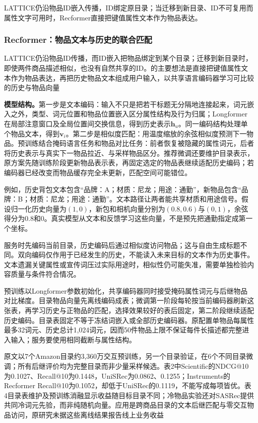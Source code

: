 LATTICE仍沿物品ID嵌入传播，ID绑定原目录；当迁移到新目录、ID不可复用而属性文字可用时，Recformer直接把键值属性文本作为物品表达。

\subsubsection{Recformer：物品文本与历史的联合匹配}
\label{sec:rs-recformer}

LATTICE仍沿物品ID传播，而ID嵌入把物品绑定到某个目录；迁移到新目录时，即使两件商品描述相似，也没有自然共享的ID。的主要想法是直接把键值属性文本作为物品表达，再把历史物品文本组成用户输入，以共享语言编码器学习可比较的历史与物品向量

\textbf{模型结构。}第一步是文本编码：输入不只是把若干标题无分隔地连接起来，词元嵌入之外，类型、词元位置和物品位置嵌入区分属性结构及行为归属；Longformer在局部注意窗口及全局位置间交换信息，得到历史表示$\bm{h}_u$。同一编码结构处理单个物品文本，得到$\bm{v}_i$。第二步是相似度匹配：用温度缩放的余弦相似度预测下一物品。预训练结合掩码语言任务和物品对比任务：前者恢复被隐藏的属性词元，后者将历史表示与真实下一物品拉近、与采样物品区分。推荐微调还要维护目录表示，原方案先随训练阶段更新物品表示表，再固定选定的物品表继续适配历史编码；若编码器已经改变而物品缓存完全未更新，匹配空间可能错位。

例如，历史背包文本包含“品牌：A；材质：尼龙；用途：通勤”，新物品包含“品牌：B；材质：尼龙；用途：通勤”。文本路径让两者能共享材质和用途信号。假设归一化历史向量为$(1,0)$，新包和相机向量分别为$(0.8,0.6)$与$(0,1)$，余弦得分为0.8和0。真实模型从文本和反馈学习这些向量，不是预先把通勤指定成第一个坐标。

服务时先编码当前目录，历史编码后通过相似度访问物品；这与自由生成标题不同。双向编码仅作用于已经发生的历史，不能读入未来目标的文本作为历史事件。文本遗漏关键属性或宣传词压过实际用途时，相似性仍可能失准，需要单独检验内容质量与条件符合情况。

预训练以Longformer参数初始化，共享编码器同时接受掩码属性词元与后继物品对比梯度。目录物品向量先离线编码成表；微调第一阶段每轮按当前编码器刷新这张表，再学习历史与正物品的匹配，选择效果较好的表后固定，第二阶段继续适配历史编码。目录表固定不等于冻结词嵌入或全部历史编码器。原配置单物品每属性最多32词元、历史总计1,024词元，因而50件物品上限不保证每件长描述都完整进入输入；服务要使用相同截断与属性结构。

原文以7个Amazon目录约3,360万交互预训练，另一个目录验证，在6个不同目录微调；所有后继评价均为完整目录而非少量采样候选。表2中Scientific的NDCG@10为0.1027、Recall@10为0.1448，UniSRec为0.0862、0.1255；Instruments的Recformer Recall@10为0.1052，却低于UniSRec的0.1119，不能写成每项皆优。表4目录表维护及预训练消融显示收益随目标目录不同；冷物品实验还对SASRec提供共同冷词元先验，而非纯随机向量。应用是跨商品目录的文本后继匹配与零交互物品访问，原研究未据这些离线结果报告线上业务收益

